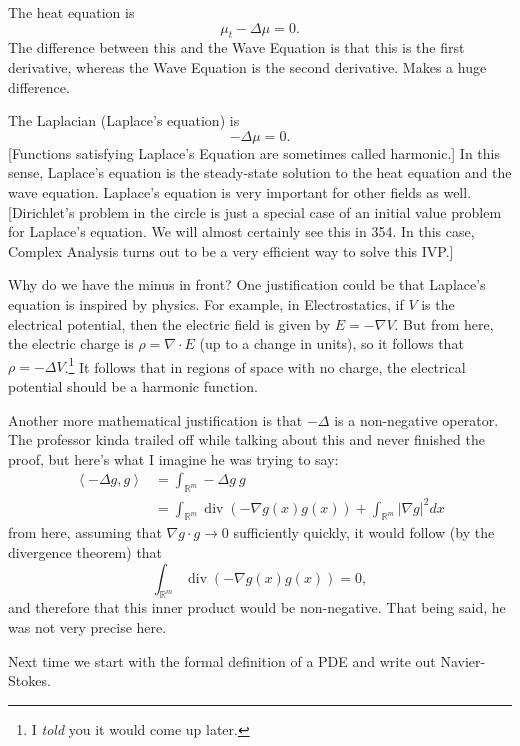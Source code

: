 \begin{example}
	The heat equation is
		\[ \mu_{t} - \Delta \mu = 0. \]
		The difference between this and the Wave Equation is that this is the first derivative, whereas the Wave Equation is the second derivative. Makes a huge difference.
\end{example}

\begin{example}
	 The Laplacian (Laplace's equation) is 
		\[ - \Delta \mu = 0. \]
		[Functions satisfying Laplace's Equation are sometimes called harmonic.] In this sense, Laplace's equation is the steady-state solution to the heat equation and the wave equation. Laplace's equation is very important for other fields as well. [Dirichlet's problem in the circle is just a special case of an initial value problem for Laplace's equation. We will almost certainly see this in 354. In this case, Complex Analysis turns out to be a very efficient way to solve this IVP.]
	\begin{remark}
		Why do we have the minus in front? One justification could be that Laplace's equation is inspired by physics. For example, in Electrostatics, if \( V \) is the electrical potential, then the electric field is given by \( E = - \nabla V  \). But from here, the electric charge is \( \rho = \nabla \cdot E \) (up to a change in units), so it follows that \( \rho = - \Delta V \).\footnote{I \textit{told} you it would come up later.} It follows that in regions of space with no charge, the electrical potential should be a harmonic function.

		Another more mathematical justification is that \( -\Delta \) is a non-negative operator. The professor kinda trailed off while talking about this and never finished the proof, but here's what I imagine he was trying to say:
		\begin{align*}
			\left\langle - \Delta g, g \right\rangle &= \int_{\mathbb{R}^{m}} - \Delta g \ g \\
			&= \int_{\mathbb{R}^{m}} \operatorname{div} \left( - \nabla g(x) g(x) \right) + \int_{\mathbb{R}^{m}}  | \nabla g|^{2} dx
		\end{align*}
		from here, assuming that \( \nabla g \cdot g \to 0 \) sufficiently quickly, it would follow (by the divergence theorem) that 
		\[ \int_{\mathbb{R}^{m}} \operatorname{div} \left( - \nabla g(x) g(x) \right) = 0, \]
		and therefore that this inner product would be non-negative. That being said, he was not very precise here.
		
	\end{remark}
\end{example}
	Next time we start with the formal definition of a PDE and write out Navier-Stokes.
